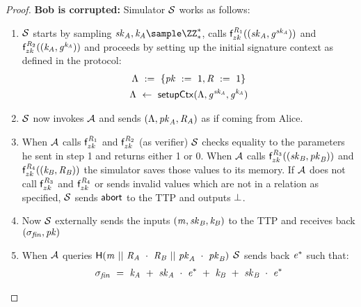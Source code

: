 \begin{proof}
    \textbf{Bob is corrupted: } Simulator $\mathcal{S}$ works as follows:
    \begin{enumerate}
        \item $\mathcal{S}$ starts by sampling $\varSecKeyAlice, \varNonceAlice \sample \cnstIntegersPrimeWithoutZero{*}$, calls $\mathsf{f}^{\mathit{R}_1}_{zk}((\mathit{sk}_{\mathit{A}}, \mathit{g}^{\mathit{sk}_{\mathit{A}}}))$ and $\mathsf{f}^{\mathit{R}_2}_{zk}((\mathit{\mathit{k}_{\mathit{A}}}, \mathit{g}^{\mathit{\mathit{k}_{\mathit{A}}}}))$ and proceeds by setting up the initial signature context as defined in the protocol:
        \begin{gather*}
            \Lambda ~:=~ \{ \mathit{pk} ~:=~ 1, \mathit{R} ~:=~ 1 \} \\
            \Lambda ~\leftarrow~ \mathsf{setupCtx}( \Lambda, \mathit{g}^{\mathit{sk}_{\mathit{A}}}, \mathit{g}^{\mathit{\mathit{k}_{\mathit{A}}}} ) \\
        \end{gather*}
        \item $\mathcal{S}$ now invokes $\mathcal{A}$ and sends $(\Lambda, \mathit{pk}_{\mathit{A}}, \mathit{R}_{\mathit{A}})$ as if coming from Alice.
        \item When $\mathcal{A}$ calls $\mathsf{f}^{\mathit{R}_1}_{zk}$ and $\mathsf{f}^{\mathit{R}_2}_{zk}$ (as verifier) $\mathcal{S}$ checks equality to the parameters he sent in step 1 and returns either 1 or 0.
        When $\mathcal{A}$ calls $\mathsf{f}^{\mathit{R}_3}_{zk}((\mathit{sk}_{\mathit{B}}, \mathit{pk}_{\mathit{B}}))$ and $\mathsf{f}^{\mathit{R}_4}_{zk}((\mathit{\mathit{k}_{\mathit{B}}}, \mathit{R}_{\mathit{B}}))$ the simulator saves those values to its memory.
        If $\mathcal{A}$ does not call $\mathsf{f}^{\mathit{R}_3}_{zk}$ and $\mathsf{f}^{\mathit{R}_4}_{zk}$ or sends invalid values which are not in a relation as specified, $\mathcal{S}$ sends $\mathsf{abort}$ to the TTP and outputs $\bot$.
        \item Now $\mathcal{S}$ externally sends the inputs $(\mathit{m}, \mathit{sk}_{\mathit{B}}, \mathit{\mathit{k}_{\mathit{B}}})$ to the TTP and receives back $(\sigma_{\mathit{fin}}, \mathit{pk})$
        \item When $\mathcal{A}$ queries $\mathsf{H} (\mathit{m} ~||~ \mathit{R}_{\mathit{A}} ~\cdot~ \mathit{R}_{\mathit{B}} ~||~ \mathit{pk}_{\mathit{A}} ~\cdot~ \mathit{pk}_{\mathit{B}})$ $\mathcal{S}$ sends back $\mathit{e}^*$ such that:
        \begin{gather*}
            \varSigFin \opEqNoQ \varNonceAlice \opAddScalar \varSecKeyAlice \opTimesScalar \funStar{\varSchnorrChallenge} \opAddScalar \varNonceBob \opAddScalar \varSecKeyBob \opTimesScalar \funStar{\varSchnorrChallenge} \\

\end{gather*}
\end{enumerate}
\end{proof}
